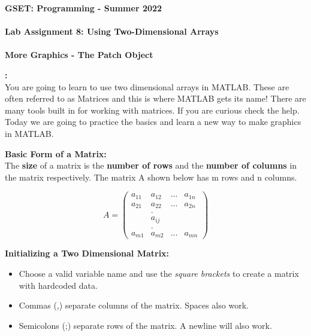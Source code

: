 \documentclass[11pt]{article}
\newcommand{\NUM}{8}
\begin{document}
	\textbf{\LARGE GSET: Programming - Summer 2022} \\\\
	\textbf{\LARGE Lab Assignment \NUM:  Using Two-Dimensional Arrays}\\\\
	\textbf{\LARGE More Graphics - The Patch Object} \\
	
	\begin{description}
        \vspace{5mm}
		\item [\textbf{ \Large Overview}] \textbf{ \Large :}\\
		
		You are going to learn to use two dimensional arrays in MATLAB. These are often referred to as Matrices and this is where MATLAB gets its name! There are many tools built in for working with matrices. If you are curious check the help. Today we are going to practice the basics and learn a new way to make graphics in MATLAB.

	    \item [\textbf{ \Large }] \textbf{ \Large Basic Form of a Matrix:}\\
	    
	    The {\bf size} of a matrix is the {\bf number of rows} and the  {\bf number of columns} in the matrix respectively. The matrix A shown below has m rows and n columns.
	    
\Large{
\[ A =\left( \begin{array}{cccc}
a_{11} & a_{12} & ...& a_{1n} \\
a_{21} & a_{22} & ...& a_{2n} \\
&.&&\\
&a_{ij}&&\\
&.&&\\
a_{m1} & a_{m2} & ...& a_{mn}\end{array} \right) \] }
		 
        \item [\textbf{ \Large }] \textbf{ \Large Initializing a Two Dimensional Matrix:}
		\begin{itemize}
	\item Choose a valid variable name and use the {\it square brackets} to create a matrix with hardcoded data.

	\item Commas (,) separate columns of the matrix. Spaces also work.

	\item Semicolons (;) separate rows of the matrix. A newline will also work.


\end{itemize}
\end{description}
\end{document}
